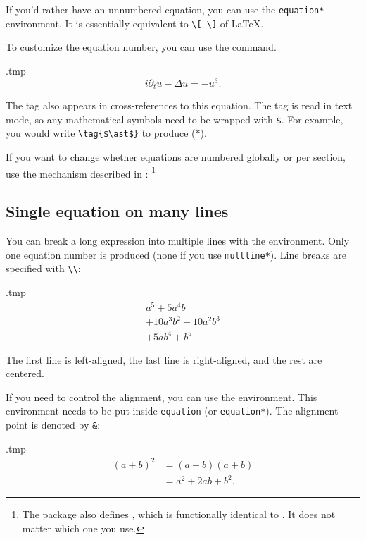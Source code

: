 If you'd rather have an unnumbered equation,
you can use the \verb|equation*| environment.
It is essentially equivalent to \verb|\[ \]| of \LaTeX.

To customize the equation number, you can use the  command.
%
\begin{VerbatimOut}{\jobname.tmp}
\begin{equation}
i \partial_t u - \Delta u = -u^3.
\tag{NLS}
\end{equation}
\end{VerbatimOut}
\ShowExample
%
The tag also appears in cross-references to this equation.
The tag is read in text mode, so any mathematical symbols need to be wrapped with \verb|$|.
For example, you would write \verb|\tag{$\ast$}| to produce ($\ast$).

If you want to change whether equations are numbered globally or per section,
use the  mechanism described in :%
\footnote{The  package also defines ,
which is functionally identical to .
It does not matter which one you use.}
%
\begin{ExampleCode}
\end{ExampleCode}


%
%
\subsection{Single equation on many lines}\label{sec:math split}

You can break a long expression into multiple lines with the  environment.
Only one equation number is produced (none if you use \verb|multline*|).
Line breaks are specified with \verb|\\|:
%
\begin{VerbatimOut}{\jobname.tmp}
\begin{multline}
a^5 + 5 a^4 b \\
+ 10 a^3 b^2 + 10 a^2 b^3\\
+ 5 a b^4 + b^5
\end{multline}
\end{VerbatimOut}
\ShowExample
%
The first line is left-aligned, the last line is right-aligned,
and the rest are centered.

If you need to control the alignment,
you can use the  environment.
This environment needs to be put inside \verb|equation| (or \verb|equation*|).
The alignment point is denoted by \verb|&|:
%
\begin{VerbatimOut}{\jobname.tmp}
\begin{equation}
\begin{split}
(a+b)^2
&= (a+b)(a+b)\\
&= a^2 + 2ab + b^2.
\end{split}
\end{equation}
\end{VerbatimOut}
\ShowExample

